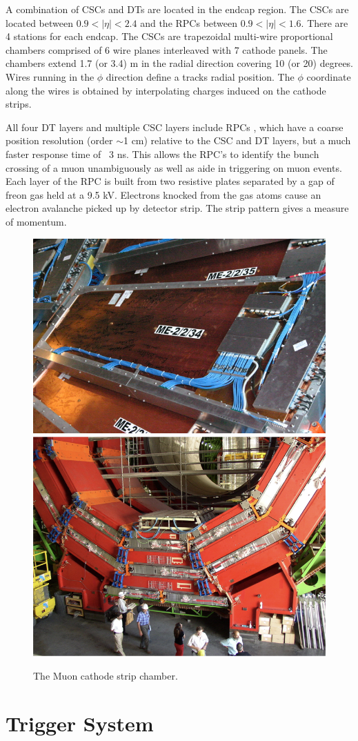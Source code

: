 A combination of CSCs and DTs are located in the endcap region. The CSCs are located between $0.9 < |\eta| < 2.4$ and the RPCs between $0.9 < |\eta| < 1.6$. There are 4 stations for each endcap. The CSCs
 are trapezoidal multi-wire proportional chambers comprised  of 6 wire planes interleaved with 7 cathode panels. The chambers
 extend 1.7 (or 3.4) m in the radial direction covering 10 (or 20) degrees. Wires running in the $\phi$ direction define
 a tracks radial position. The $\phi$ coordinate along the wires is obtained by interpolating charges induced 
on the cathode strips. 

All four DT layers and multiple CSC layers include RPCs , which have a coarse position resolution
(order $\sim$1 cm) relative to the CSC and DT layers, but a much faster response time of ~3 ns.
This allows the RPC's to identify the bunch crossing of a muon unambiguously as well 
as aide in triggering on muon events. Each layer of the RPC is built from two resistive
 plates separated by a gap of freon gas held at a 9.5 kV.
Electrons knocked from the gas atoms cause an electron avalanche picked up by detector strip. The 
strip pattern gives a measure of momentum.

\begin{figure}
\begin{center}
\includegraphics[width=.45\textwidth]{pics/cathode_strip_chamber}
\includegraphics[width=.45\textwidth]{pics/rpc_plates}
\end{center}
\caption{The Muon cathode strip chamber.}
\label{fig:strip_chamber}
\end{figure}

\section{Trigger System}

